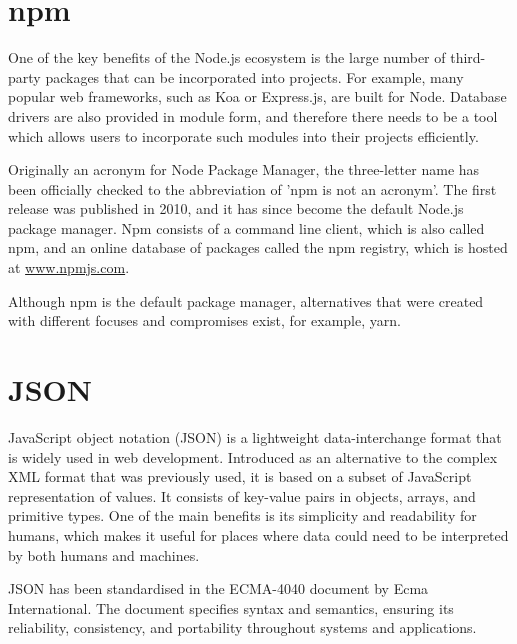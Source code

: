 \section{npm}
One of the key benefits of the Node.js ecosystem is the large number of third-party packages that can be incorporated into projects. For example, many popular web frameworks, such as Koa or Express.js, are built for Node. Database drivers are also provided in module form, and therefore there needs to be a tool which allows users to incorporate such modules into their projects efficiently. \par
Originally an acronym for Node Package Manager, the three-letter name has been officially checked to the abbreviation of 'npm is not an acronym'. The first release was published in 2010, and it has since become the default Node.js package manager. Npm consists of a command line client, which is also called npm, and an online database of packages called the npm registry, which is hosted at \url{www.npmjs.com}. \par
Although npm is the default package manager, alternatives that were created with different focuses and compromises exist, for example, yarn.\par

\section{JSON}
JavaScript object notation (JSON) is a lightweight data-interchange format that is widely used in web development. Introduced as an alternative to the complex XML format that was previously used, it is based on a subset of JavaScript representation of values. It consists of key-value pairs in objects, arrays, and primitive types. One of the main benefits is its simplicity and readability for humans, which makes it useful for places where data could need to be interpreted by both humans and machines.\par
JSON has been standardised in the ECMA-4040 document by Ecma International. The document specifies syntax and semantics, ensuring its reliability, consistency, and portability throughout systems and applications.\par

